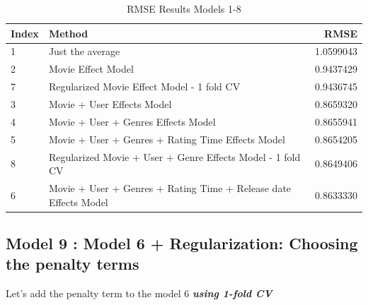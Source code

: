 \documentclass[
]{article}
\begin{document}
\begin{table}[H]

\caption{\label{tab:m8_4}RMSE Results Models 1-8\label{tbl:rmse_results_model_1-8}}
\centering
\fontsize{7}{9}\selectfont
\begin{tabular}[t]{llr}
\toprule
Index & Method & RMSE\\
\midrule
1 & Just the average & 1.0599043\\
2 & Movie Effect Model & 0.9437429\\
7 & Regularized Movie Effect Model - 1 fold CV & 0.9436745\\
3 & Movie + User Effects Model & 0.8659320\\
4 & Movie + User + Genres Effects Model & 0.8655941\\
5 & Movie + User + Genres + Rating Time Effects Model & 0.8654205\\
8 & Regularized Movie + User + Genre Effects Model - 1 fold CV & 0.8649406\\
6 & Movie + User + Genres + Rating Time + Release date Effects Model & 0.8633330\\
\bottomrule
\end{tabular}
\end{table}

\newpage

\hypertarget{model-9-model-6-regularization-choosing-the-penalty-terms}{%
\subsection{Model 9 : Model 6 + Regularization: Choosing the penalty
terms}\label{model-9-model-6-regularization-choosing-the-penalty-terms}}

Let's add the penalty term to the model 6 \textbf{\emph{using 1-fold
CV}}
\end{document}

